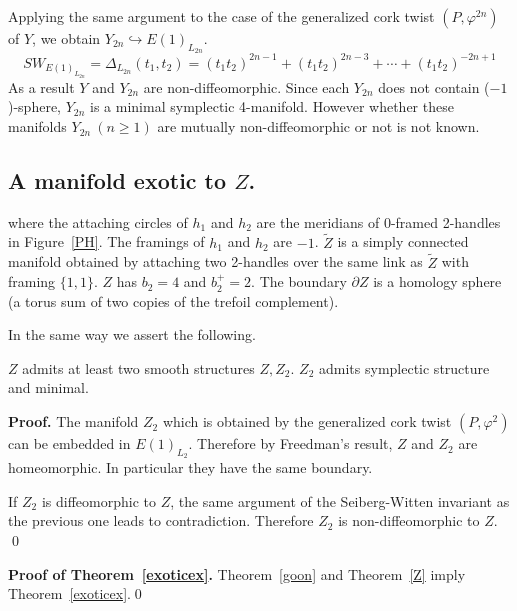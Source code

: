 \documentclass[11pt]{amsart}
\begin{document}
Applying the same argument to the case of the generalized cork twist $(P,\varphi^{2n})$ of $Y$,
we obtain $Y_{2n}\hookrightarrow E(1)_{L_{2n}}$.
$$SW_{E(1)_{L_{2n}}}=\Delta_{L_{2n}}(t_1,t_2)=(t_1t_2)^{2n-1}+(t_1t_2)^{2n-3}+\cdots+(t_1t_2)^{-2n+1}$$
As a result $Y$ and $Y_{2n}$ are non-diffeomorphic.
Since each $Y_{2n}$ does not contain ($-1$)-sphere, $Y_{2n}$ is a minimal symplectic 4-manifold.
However whether these manifolds $Y_{2n}\ (n\ge 1)$ are mutually non-diffeomorphic or not is not known.
\medskip

\subsection{A manifold exotic to $Z$.}
where the attaching circles of $h_1$ and $h_2$ are the meridians of $0$-framed 2-handles in Figure~\ref{PH}.
The framings of $h_1$ and $h_2$ are $-1$.
$\tilde{Z}$ is a simply connected manifold obtained by attaching two 2-handles over the same link as $\tilde{Z}$ with framing $\{1,1\}$.
$Z$ has $b_2=4$ and $b_2^+=2$.
The boundary $\partial Z$ is a homology sphere (a torus sum of two copies of the trefoil complement).

In the same way we assert the following.
\begin{thm}
\label{Z}
$Z$ admits at least two smooth structures $Z, Z_2$.
$Z_2$ admits symplectic structure and minimal.
\end{thm}
{{\bf Proof. }}
The manifold $Z_2$ which is obtained by the generalized cork twist $(P,\varphi^{2})$ can be 
embedded in $E(1)_{L_2}$.
Therefore by Freedman's result, $Z$ and $Z_2$ are homeomorphic.
In particular they have the same boundary.

If $Z_2$ is diffeomorphic to $Z$, the same argument of the Seiberg-Witten invariant as the
previous one leads to contradiction.
Therefore $Z_2$ is non-diffeomorphic to $Z$.
\qed

{\bf Proof of Theorem~\ref{exoticex}.}
Theorem~\ref{goon} and Theorem~\ref{Z} imply Theorem~\ref{exoticex}.\qed
\end{document}
